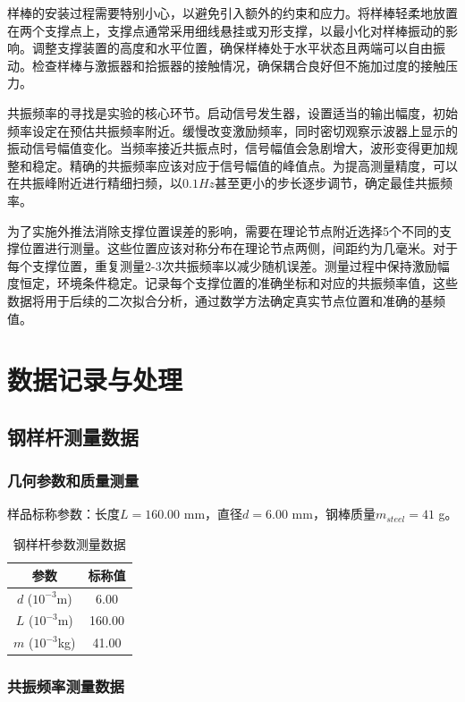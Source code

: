 ﻿\documentclass[12pt,a4paper]{article}
\begin{document}
样棒的安装过程需要特别小心，以避免引入额外的约束和应力。将样棒轻柔地放置在两个支撑点上，支撑点通常采用细线悬挂或刃形支撑，以最小化对样棒振动的影响。调整支撑装置的高度和水平位置，确保样棒处于水平状态且两端可以自由振动。检查样棒与激振器和拾振器的接触情况，确保耦合良好但不施加过度的接触压力。

共振频率的寻找是实验的核心环节。启动信号发生器，设置适当的输出幅度，初始频率设定在预估共振频率附近。缓慢改变激励频率，同时密切观察示波器上显示的振动信号幅值变化。当频率接近共振点时，信号幅值会急剧增大，波形变得更加规整和稳定。精确的共振频率应该对应于信号幅值的峰值点。为提高测量精度，可以在共振峰附近进行精细扫频，以$0.1Hz$甚至更小的步长逐步调节，确定最佳共振频率。

为了实施外推法消除支撑位置误差的影响，需要在理论节点附近选择5个不同的支撑位置进行测量。这些位置应该对称分布在理论节点两侧，间距约为几毫米。对于每个支撑位置，重复测量2-3次共振频率以减少随机误差。测量过程中保持激励幅度恒定，环境条件稳定。记录每个支撑位置的准确坐标和对应的共振频率值，这些数据将用于后续的二次拟合分析，通过数学方法确定真实节点位置和准确的基频值。

\section{数据记录与处理}

\subsection{钢样杆测量数据}

\subsubsection{几何参数和质量测量}

样品标称参数：长度$L = 160.00$ mm，直径$d = 6.00$ mm，钢棒质量$m_{steel} = 41$ g。

\begin{table}[H]
\centering
\caption{钢样杆参数测量数据}
\begin{tabular}{|c|c|}
\hline
参数 & 标称值 \\
\hline
$d$ ($10^{-3}$m) & 6.00 \\
\hline
$L$ ($10^{-3}$m) & 160.00 \\
\hline
$m$ ($10^{-3}$kg) & 41.00 \\
\hline
\end{tabular}
\end{table}

\subsubsection{共振频率测量数据}
\end{document}
